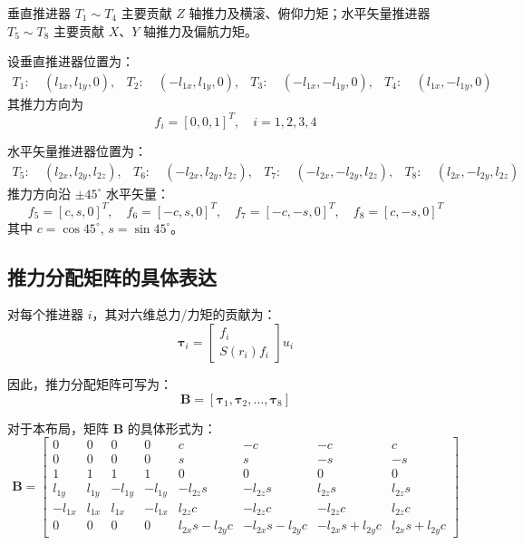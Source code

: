 垂直推进器 $T_{1}\sim T_{4}$ 主要贡献 $Z$ 轴推力及横滚、俯仰力矩；水平矢量推进器 $T_{5}\sim T_{8}$ 主要贡献 $X$、$Y$ 轴推力及偏航力矩。

设垂直推进器位置为：
\begin{align}
T_{1}:&~(l_{1x}, l_{1y}, 0), & T_{2}:&~(-l_{1x}, l_{1y}, 0), & T_{3}:&~(-l_{1x}, -l_{1y}, 0), & T_{4}:&~(l_{1x}, -l_{1y}, 0)
\end{align}
其推力方向为
\begin{equation}
f_{i} = [0, 0, 1]^T, \quad i = 1,2,3,4
\end{equation}

水平矢量推进器位置为：
\begin{align}
T_{5}:&~(l_{2x}, l_{2y}, l_{2z}), & T_{6}:&~(-l_{2x}, l_{2y}, l_{2z}), & T_{7}:&~(-l_{2x}, -l_{2y}, l_{2z}), & T_{8}:&~(l_{2x}, -l_{2y}, l_{2z})
\end{align}
推力方向沿 $\pm 45^{\circ}$ 水平矢量：
\begin{equation}
f_{5} = [c, s, 0]^T,\quad f_{6} = [-c, s, 0]^T,\quad f_{7} = [-c, -s, 0]^T,\quad f_{8} = [c, -s, 0]^T
\end{equation}
其中 $c = \cos 45^{\circ}$, $s = \sin 45^{\circ}$。

\subsection{推力分配矩阵的具体表达}

对每个推进器 $i$，其对六维总力/力矩的贡献为：
\begin{equation}
\boldsymbol{\tau}_{i} = \begin{bmatrix}
f_{i} \\
S(r_{i}) f_{i}
\end{bmatrix} u_{i}
\end{equation}

因此，推力分配矩阵可写为：
\begin{equation}
\boldsymbol{B} = [\boldsymbol{\tau}_{1}, \boldsymbol{\tau}_{2}, \ldots, \boldsymbol{\tau}_{8}]
\end{equation}

对于本布局，矩阵 $\boldsymbol{B}$ 的具体形式为：
\begin{equation}
\boldsymbol{B} =
\begin{bmatrix}
0 & 0 & 0 & 0 & c & -c & -c & c \\
0 & 0 & 0 & 0 & s & s & -s & -s \\
1 & 1 & 1 & 1 & 0 & 0 & 0 & 0 \\
l_{1y} & l_{1y} & -l_{1y} & -l_{1y} & -l_{2z} s & -l_{2z} s & l_{2z} s & l_{2z} s \\
- l_{1x} & l_{1x} & l_{1x} & - l_{1x} & l_{2z} c & - l_{2z} c & - l_{2z} c & l_{2z} c \\
0 & 0 & 0 & 0 & l_{2x} s - l_{2y} c & - l_{2x} s - l_{2y} c & - l_{2x} s + l_{2y} c & l_{2x} s + l_{2y} c
\end{bmatrix}
\end{equation}

